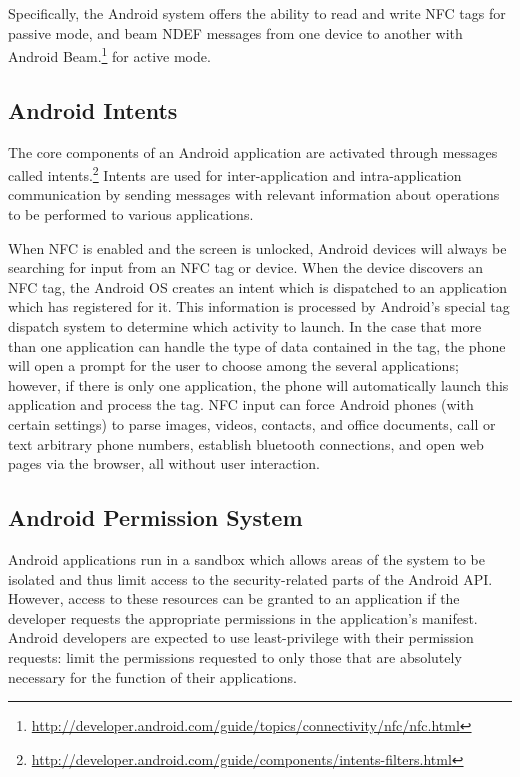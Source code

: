 \documentclass[12pt]{article}
\newcommand\TODO[1]{\textcolor{red}{#1}}
\begin{document}
Specifically, the Android system offers the ability to read and write NFC tags for passive mode, and beam NDEF messages from one device to another with Android Beam.\footnote{\url{http://developer.android.com/guide/topics/connectivity/nfc/nfc.html}} for active mode. 

\subsection{Android Intents}
The core components of an Android application are activated through messages called intents.\footnote{\url{http://developer.android.com/guide/components/intents-filters.html}}
Intents are used for inter-application and intra-application communication by sending messages with relevant information about operations to be performed to various applications.  

When NFC is enabled and the screen is unlocked, Android devices will always be searching for input from an NFC tag or device. 
When the device discovers an NFC tag, the Android OS creates an intent which is dispatched to an application which has registered for it.
This information is processed by Android's special tag dispatch system to determine which activity to launch.
In the case that more than one application can handle the type of data contained in the tag, the phone will open a prompt for the user to choose among the several applications; however, if there is only one application, the phone will automatically launch this application and process the tag.
NFC input can force Android phones (with certain settings) to parse images, videos, contacts, and office documents, call or text arbitrary phone numbers, establish bluetooth connections, and open web pages via the browser, all without user interaction.  

\subsection{Android Permission System}
Android applications run in a sandbox which allows areas of the system to be isolated and thus limit access to the security-related parts of the Android API.
However, access to these resources can be granted to an application if the developer requests the appropriate permissions in the application's manifest.
Android developers are expected to use least-privilege with their permission requests: limit the permissions requested to only those that are absolutely necessary for the function of their applications. 
\end{document}
